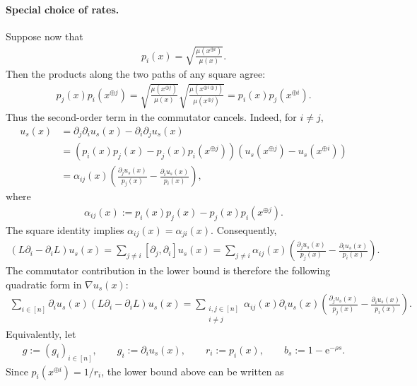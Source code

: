 \documentclass[11pt]{article}
\theoremstyle{plain}
\theoremstyle{definition}
\theoremstyle{remark}
\newcommand{\e}{\mathrm{e}}
\newcommand{\tuple}[1]{\left(#1\right)}
\newcommand{\tp}{\tuple}
\begin{document}
\paragraph{Special choice of rates.}
Suppose now that
\begin{align*}
    p_i(x)=\sqrt{\frac{\mu(x^{\oplus i})}{\mu(x)}}.
\end{align*}
Then the products along the two paths of any square agree:
\begin{align*}
    p_j(x)p_i(x^{\oplus j})
    =
    \sqrt{\frac{\mu(x^{\oplus j})}{\mu(x)}}
    \sqrt{\frac{\mu(x^{\oplus i\oplus j})}{\mu(x^{\oplus j})}}
    =
    p_i(x)p_j(x^{\oplus i}).
\end{align*}
Thus the second-order term in the commutator cancels. Indeed, for $i \neq j$,
\begin{align*}
    [\partial_j,\partial_i]u_s(x)
    &=
    \partial_j\partial_i u_s(x)-\partial_i\partial_j u_s(x)\\
    &=
    \tp{p_i(x)p_j(x)-p_j(x)p_i(x^{\oplus j})}
    \tp{u_s(x^{\oplus j})-u_s(x^{\oplus i})}\\
    &=
    \alpha_{ij}(x)
    \tp{\frac{\partial_j u_s(x)}{p_j(x)}
    -\frac{\partial_i u_s(x)}{p_i(x)}},
\end{align*}
where
\begin{align*}
    \alpha_{ij}(x):=p_i(x)p_j(x)-p_j(x)p_i(x^{\oplus j}).
\end{align*}
The square identity implies $\alpha_{ij}(x)=\alpha_{ji}(x)$.
Consequently,
\begin{align*}
    (L\partial_i-\partial_i L)u_s(x)
    =
    \sum_{j \neq i}[\partial_j,\partial_i]u_s(x)
    =
    \sum_{j \neq i}\alpha_{ij}(x)
    \tp{\frac{\partial_j u_s(x)}{p_j(x)}
    -\frac{\partial_i u_s(x)}{p_i(x)}}.
\end{align*}
The commutator contribution in the lower bound is therefore the following quadratic form in
$\nabla u_s(x)$:
\begin{align*}
    \sum_{i \in [n]}\partial_i u_s(x)(L\partial_i-\partial_i L)u_s(x)
    =
    \sum_{\substack{i,j \in [n]\\ i\neq j}}
    \alpha_{ij}(x)\partial_i u_s(x)
    \tp{\frac{\partial_j u_s(x)}{p_j(x)}
    -\frac{\partial_i u_s(x)}{p_i(x)}}.
\end{align*}
Equivalently, let
\begin{align*}
    g:=\tp{g_i}_{i\in[n]},\qquad
    g_i:=\partial_i u_s(x),\qquad
    r_i:=p_i(x),\qquad
    b_s:=1-\e^{-\rho s}.
\end{align*}
Since $p_i(x^{\oplus i})=1/r_i$, the lower bound above can be written as
\end{document}
